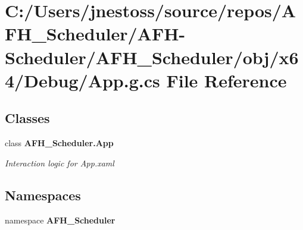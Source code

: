 \section{C\+:/\+Users/jnestoss/source/repos/\+A\+F\+H\+\_\+\+Scheduler/\+A\+F\+H-\/\+Scheduler/\+A\+F\+H\+\_\+\+Scheduler/obj/x64/\+Debug/\+App.g.\+cs File Reference}
\label{x64_2_debug_2_app_8g_8cs}
\subsection*{Classes}
\begin{DoxyCompactItemize}
\item 
class \textbf{ A\+F\+H\+\_\+\+Scheduler.\+App}
\begin{DoxyCompactList}\small\item\em Interaction logic for App.\+xaml \end{DoxyCompactList}\end{DoxyCompactItemize}
\subsection*{Namespaces}
\begin{DoxyCompactItemize}
\item 
namespace \textbf{ A\+F\+H\+\_\+\+Scheduler}
\end{DoxyCompactItemize}
